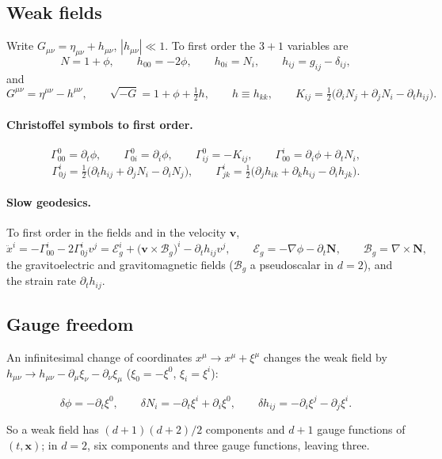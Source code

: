 \documentclass[11pt,aps,preprint,nofootinbib,superscriptaddress,tightenlines]{revtex4-2}
\def\st{\begin{equation}}
\def\stp{\end{equation}}
\let\oldparagraph\paragraph
\renewcommand{\paragraph}{\par\bigskip\oldparagraph}
\begin{document}
\subsection{Weak fields}

Write $G_{\mu\nu}=\eta_{\mu\nu}+h_{\mu\nu}$, $|h_{\mu\nu}|\ll1$.  To first order the $3+1$ variables are
\st
N=1+\phi,\qquad h_{00}=-2\phi,\qquad h_{0i}=N_i,\qquad h_{ij}=g_{ij}-\delta_{ij},
\stp
and
\st
G^{\mu\nu}=\eta^{\mu\nu}-h^{\mu\nu},\qquad \sqrt{-G}=1+\phi+\tfrac12h,\qquad h\equiv h_{kk},\qquad
K_{ij}=\tfrac12\big(\partial_iN_j+\partial_jN_i-\partial_th_{ij}\big) .
\stp

\paragraph{Christoffel symbols to first order.}
\st
\Gamma^0_{00}=\partial_t\phi,\qquad \Gamma^0_{0i}=\partial_i\phi,\qquad \Gamma^0_{ij}=-K_{ij},\qquad
\Gamma^i_{00}=\partial_i\phi+\partial_tN_i,
\stp
\st
\Gamma^i_{0j}=\tfrac12\big(\partial_th_{ij}+\partial_jN_i-\partial_iN_j\big),\qquad
\Gamma^i_{jk}=\tfrac12\big(\partial_jh_{ik}+\partial_kh_{ij}-\partial_ih_{jk}\big) .
\stp

\paragraph{Slow geodesics.}  To first order in the fields and in the velocity $\bm v$,
\st
\ddot x^i=-\Gamma^i_{00}-2\Gamma^i_{0j}v^j=\mathcal E_g^i+\big(\bm v\times\mathcal B_g\big)^i-\partial_th_{ij}v^j,\qquad
\mathcal E_g=-\nabla\phi-\partial_t\bm N,\qquad \mathcal B_g=\nabla\times\bm N ,
\stp
the gravitoelectric and gravitomagnetic fields ($\mathcal B_g$ a pseudoscalar in $d=2$), and the strain rate $\partial_th_{ij}$.

\subsection{Gauge freedom}

An infinitesimal change of coordinates $x^\mu\to x^\mu+\xi^\mu$ changes the weak field by $h_{\mu\nu}\to h_{\mu\nu}-\partial_\mu\xi_\nu-\partial_\nu\xi_\mu$
($\xi_0=-\xi^0$, $\xi_i=\xi^i$):
\begin{keyeq}
\st
\delta\phi=-\partial_t\xi^0,\qquad \delta N_i=-\partial_t\xi^i+\partial_i\xi^0,\qquad \delta h_{ij}=-\partial_i\xi^j-\partial_j\xi^i .
\label{gauge}
\stp
\end{keyeq}
So a weak field has $(d+1)(d+2)/2$ components and $d+1$ gauge functions of $(t,\bm x)$; in $d=2$, six components and three gauge functions, leaving three.
\end{document}
